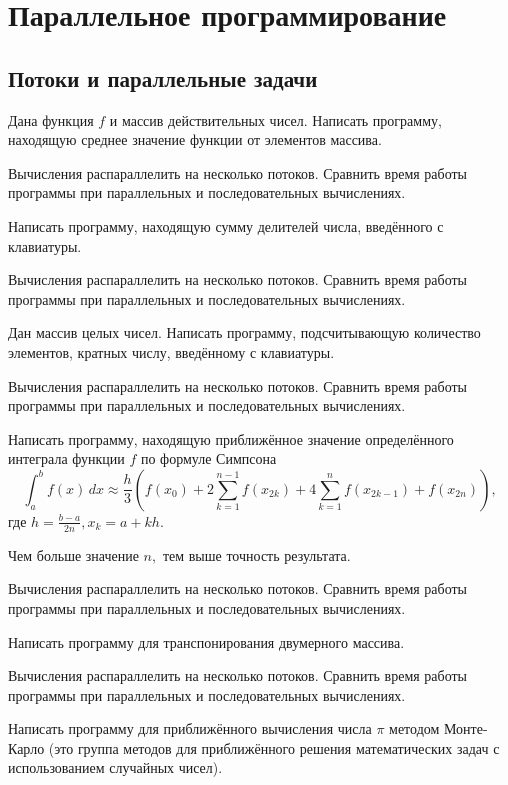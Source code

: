 \section{Параллельное программирование}

\subsection{Потоки и параллельные задачи}

\task Дана функция $f$ и массив действительных чисел. Написать
программу, находящую среднее значение функции от элементов
массива.

Вычисления распараллелить на несколько потоков. Сравнить время работы
программы при параллельных и последовательных вычислениях.

\task Написать программу, находящую сумму делителей числа, введённого
с клавиатуры.

Вычисления распараллелить на несколько потоков. Сравнить время работы
программы при параллельных и последовательных вычислениях.

\task Дан массив целых чисел. Написать программу, подсчитывающую
количество элементов, кратных числу, введённому с клавиатуры.

Вычисления распараллелить на несколько потоков. Сравнить время работы
программы при параллельных и последовательных вычислениях.

\task Написать программу, находящую приближённое значение
определённого интеграла функции $f$ по формуле
Симпсона
\[
\int_a^b f(x)\,dx \approx \frac{h}3 \left(
  f(x_0) + 2\sum_{k=1}^{n-1} f(x_{2k}) + 4\sum_{k=1}^n f(x_{2k-1}) + f(x_{2n})
\right),
\]
где $h = \frac{b-a}{2n}, x_k=a+kh.$ 

Чем больше значение $n,$ тем выше точность результата.

Вычисления распараллелить на несколько потоков. Сравнить время работы
программы при параллельных и последовательных вычислениях.

\task Написать программу для транспонирования двумерного массива.

Вычисления распараллелить на несколько потоков. Сравнить время работы
программы при параллельных и последовательных вычислениях.

\task Написать программу для приближённого вычисления числа $\pi$
методом Монте-Карло (это группа методов для
приближённого решения математических задач с использованием случайных
чисел).

